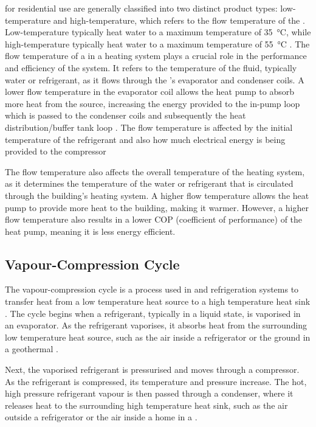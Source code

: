 \HPs for residential use are generally classified into two distinct product types: low-temperature and high-temperature, which refers to the flow temperature of the \HP. Low-temperature \HPs typically heat water to a maximum temperature of \qty{35}{\celsius}, while high-temperature \HPs typically heat water to a maximum temperature of \qty{55}{\celsius} \cite{keogh_technical_2018}. The flow temperature of a \HP in a heating system plays a crucial role in the performance and efficiency of the system. It refers to the temperature of the fluid, typically water or refrigerant, as it flows through the \HP's evaporator and condenser coils. A lower flow temperature in the evaporator coil allows the heat pump to absorb more heat from the source, increasing the energy provided to the in-pump loop which is passed to the condenser coils and subsequently the heat distribution/buffer tank loop \cite{nowak_2018}. The flow temperature is affected by the initial temperature of the refrigerant and also how much electrical energy is being provided to the compressor 

The flow temperature also affects the overall temperature of the heating system, as it determines the temperature of the water or refrigerant that is circulated through the building's heating system. A higher flow temperature allows the heat pump to provide more heat to the building, making it warmer. However, a higher flow temperature also results in a lower COP (coefficient of performance) of the heat pump, meaning it is less energy efficient.

\subsection{Vapour-Compression Cycle}\label{subsec:vapourcompcycle}
The vapour-compression cycle is a process used in \HPs and refrigeration systems to transfer heat from a low temperature heat source to a high temperature heat sink \cite{cengel_thermo_2020}. The cycle begins when a refrigerant, typically in a liquid state, is vaporised in an evaporator. As the refrigerant vaporises, it absorbs heat from the surrounding low temperature heat source, such as the air inside a refrigerator or the ground in a geothermal \HP.

Next, the vaporised refrigerant is pressurised and moves through a compressor. As the refrigerant is compressed, its temperature and pressure increase. The hot, high pressure refrigerant vapour is then passed through a condenser, where it releases heat to the surrounding high temperature heat sink, such as the air outside a refrigerator or the air inside a home in a \HP.

